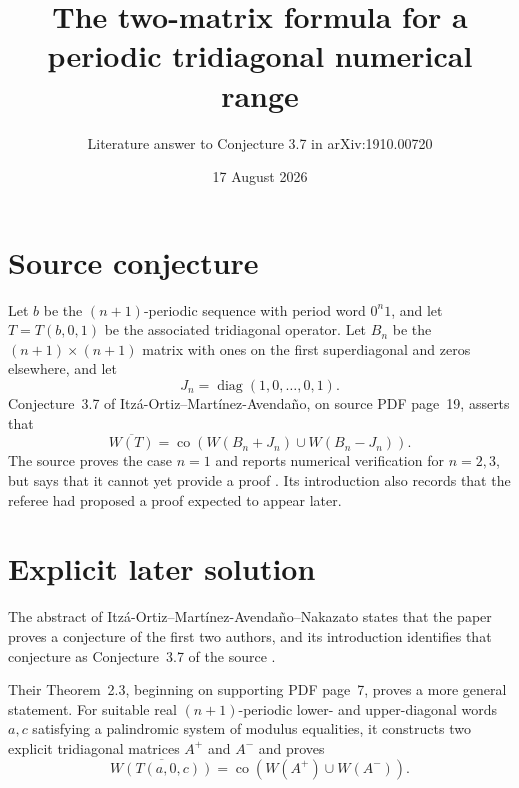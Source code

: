 \documentclass[11pt]{article}
\title{The two-matrix formula for a periodic tridiagonal numerical range}
\author{Literature answer to Conjecture 3.7 in arXiv:1910.00720}
\date{17 August 2026}
\begin{document}
\maketitle

\begin{center}
\end{center}

\section*{Source conjecture}
Let $b$ be the $(n+1)$-periodic sequence with period word $0^n1$, and let
$T=T(b,0,1)$ be the associated tridiagonal operator.  Let $B_n$ be the
$(n+1)\times(n+1)$ matrix with ones on the first superdiagonal and zeros
elsewhere, and let
\[
 J_n=\operatorname{diag}(1,0,\ldots,0,1).
\]
Conjecture~3.7 of Itzá-Ortiz--Martínez-Avendaño, on source PDF page~19,
asserts that
\begin{equation}\label{eq:source}
 \overline{W(T)}=\operatorname{co}\!\left(
 W(B_n+J_n)\cup W(B_n-J_n)\right).
\end{equation}
The source proves the case $n=1$ and reports numerical verification for
$n=2,3$, but says that it cannot yet provide a proof \cite{IM}.  Its
introduction also records that the referee had proposed a proof expected to
appear later.

\section*{Explicit later solution}
The abstract of Itzá-Ortiz--Martínez-Avendaño--Nakazato states that the paper
proves a conjecture of the first two authors, and its introduction identifies
that conjecture as Conjecture~3.7 of the source \cite{IMN}.

Their Theorem~2.3, beginning on supporting PDF page~7, proves a more general
statement.  For suitable real $(n+1)$-periodic lower- and upper-diagonal words
$a,c$ satisfying a palindromic system of modulus equalities, it constructs two
explicit tridiagonal matrices $A^+$ and $A^-$ and proves
\[
 \overline{W(T(a,0,c))}
 =\operatorname{co}\!\left(W(A^+)\cup W(A^-)\right).
\]
\end{document}
